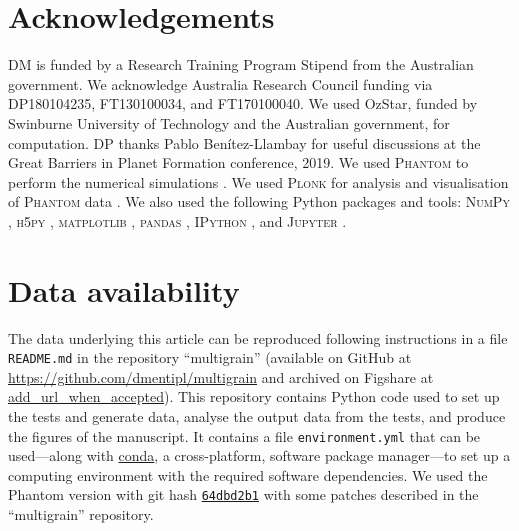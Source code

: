 \documentclass[fleqn,usenatbib]{mnras}
\begin{document}
\section*{Acknowledgements}

DM is funded by a Research Training Program Stipend from the Australian
government. We acknowledge Australia Research Council funding via DP180104235,
FT130100034, and FT170100040. We used OzStar, funded by Swinburne University of
Technology and the Australian government, for computation. DP thanks Pablo
Benítez-Llambay for useful discussions at the Great Barriers in Planet Formation
conference, 2019. We used \textsc{Phantom} to perform the numerical simulations
\citep{Price2018PASA...35...31P}. We used \textsc{Plonk} for analysis and
visualisation of \textsc{Phantom} data \citep{Mentiplay2019JOSS....4.1884M}. We
also used the following Python packages and tools: \textsc{NumPy}
\citep{Oliphant2006, van-der-Walt2011CSE....13b..22V}, \textsc{h5py}
\citep{Collette2013}, \textsc{matplotlib} \citep{Hunter2007CSE.....9...90H},
\textsc{pandas} \citep{McKinney2010}, \textsc{IPython}
\citep{Perez2007CSE.....9c..21P}, and \textsc{Jupyter} \citep{Kluyver2016}.


\section*{Data availability}

The data underlying this article can be reproduced following instructions in a
file \texttt{README.md} in the repository ``multigrain'' (available on GitHub at
\url{https://github.com/dmentipl/multigrain} and archived on Figshare at
\url{add_url_when_accepted}). This repository contains Python code used to set
up the tests and generate data, analyse the output data from the tests, and
produce the figures of the manuscript. It contains a file
\texttt{environment.yml} that can be used---along with
\href{https://conda.io/}{conda}, a cross-platform, software package manager---to
set up a computing environment with the required software dependencies. We used
the Phantom version with git hash
\href{https://github.com/danieljprice/phantom/commit/64dbd2b124ca74051eed920d6cad0a2e83157478}{\texttt{64dbd2b1}}
with some patches described in the ``multigrain'' repository.














\bsp %
\label{lastpage}
\end{document}

